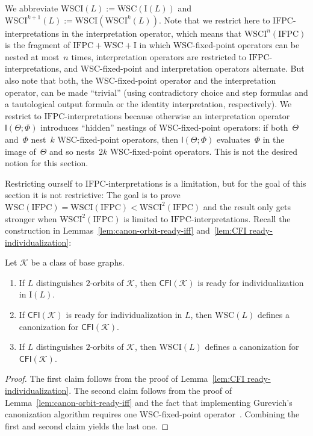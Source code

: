 \documentclass[]{lmcs}
\newcommand{\formA}{\Phi}
\newcommand{\interpret}{\Theta}
\newcommand{\GraphClass}{\mathcal{K}}
\newcommand{\IFPC}{\ensuremath{\mathrm{IFPC}}}
\newcommand{\IFPCWSCI}{\ensuremath{\mathrm{IFPC{+}WSC{+}I}}}
\newcommand{\WSCof}[1]{\mathrm{WSC}(#1)}
\newcommand{\Iof}[1]{\mathrm{I}(#1)}
\newcommand{\WSCIof}[1]{\mathrm{WSCI}(#1)}
\newcommand{\WSCIkof}[2]{\mathrm{WSCI}^{#1}(#2)}
\newcommand{\iop}[2]{\mathsf{I}(#1;#2)}
\newcommand{\CFIsym}{\mathsf{CFI}}
\newcommand{\CFI}[1]{\CFIsym(#1)}
\begin{document}
We abbreviate $\WSCIof{L} :=  \WSCof{\Iof{L}}$ and $\WSCIkof{k+1}{L} := \WSCIof{\WSCIkof{k}{L}}$.
Note that we restrict here to \IFPC{}-interpretations in the interpretation operator, which means that $\WSCIkof{n}{\IFPC}$ is the fragment of $\IFPCWSCI$
in which WSC-fixed-point operators can be nested at most~$n$ times,
interpretation operators are restricted to \IFPC{}-interpretations,
and WSC-fixed-point and interpretation operators alternate.
But also note that both, the WSC-fixed-point operator and the interpretation operator, can be made ``trivial'' (using contradictory choice and step formulas and a tautological output formula or the identity interpretation, respectively).
We restrict to \IFPC{}-interpretations because otherwise an interpretation operator $\iop{\interpret}{\formA}$ introduces ``hidden'' nestings of WSC-fixed-point operators: if both~$\interpret$ and~$\formA$ nest~$k$ WSC-fixed-point operators, then $\iop{\interpret}{\formA}$ evaluates~$\formA$ in the image of~$\interpret$ and so nests~$2k$ WSC-fixed-point operators.
This is not the desired notion for this section.

Restricting ourself to \IFPC{}-interpretations is a limitation,
but for the goal of this section it is not restrictive:
The goal is to prove $\WSCof{\IFPC{}} = \WSCIof{\IFPC{}} < \WSCIkof{2}{\IFPC{}}$ and the result only gets stronger when $\WSCIkof{2}{\IFPC{}}$ is limited to \IFPC{}-interpretations.
Recall the construction in Lemmas~\ref{lem:canon-orbit-ready-iff} and~\ref{lem:CFI ready-individualization}:
\begin{cor}
	\label{cor:canonize-CFI if-base-wsci}
	Let $\GraphClass$ be a class of base graphs.
	\begin{enumerate}
		\item If $L$ distinguishes $2$-orbits of $\GraphClass$,
		then $\CFI{\GraphClass}$ is ready for individualization in 
		$\Iof{L}$.
		\item If $\CFI{\GraphClass}$ is ready for individualization in $L$, then $\WSCof{L}$ defines a canonization for $\CFI{\GraphClass}$.
		\item If $L$ distinguishes $2$-orbits of $\GraphClass$,
		then $\WSCIof{L}$ defines a canonization for $\CFI{\GraphClass}$.
	\end{enumerate}
\end{cor}
\begin{proof}
	The first claim follows from the proof of Lemma~\ref{lem:CFI ready-individualization}.
	The second claim follows from the proof of Lemma~\ref{lem:canon-orbit-ready-iff}
	and the fact that implementing Gurevich's canonization algorithm
	requires one WSC-fixed-point operator~\cite{LichterSchweitzer24}.
	Combining the first and second claim yields the last one.
\end{proof}
\end{document}
